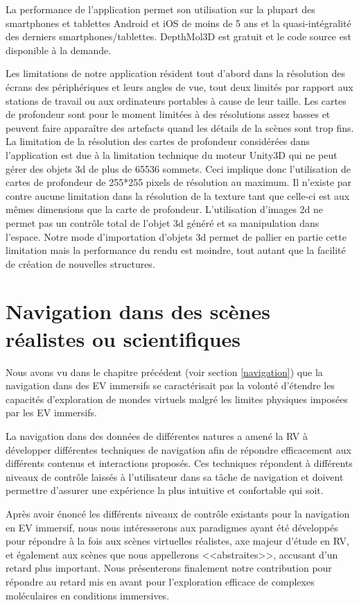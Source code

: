 La performance de l'application permet son utilisation sur la plupart des smartphones et tablettes Android et iOS de moins de 5 ans et la quasi-intégralité des derniers smartphones/tablettes. DepthMol3D est gratuit et le code source est disponible à la demande.

Les limitations de notre application résident tout d'abord dans la résolution des écrans des périphériques et leurs angles de vue, tout deux limités par rapport aux stations de travail ou aux ordinateurs portables à cause de leur taille. Les cartes de profondeur sont pour le moment limitées à des résolutions assez basses et peuvent faire apparaître des artefacts quand les détails de la scènes sont trop fins. La limitation de la résolution des cartes de profondeur considérées dans l'application est due à la limitation technique du moteur Unity3D qui ne peut gérer des objets 3d de plus de 65536 sommets. Ceci implique donc l'utilisation de cartes de profondeur de 255*255 pixels de résolution au maximum. Il n'existe par contre aucune limitation dans la résolution de la texture tant que celle-ci est aux mêmes dimensions que la carte de profondeur. L'utilisation d'images 2d ne permet pas un contrôle total de l'objet 3d généré et sa manipulation dans l'espace. Notre mode d'importation d'objets 3d permet de pallier en partie cette limitation mais la performance du rendu est moindre, tout autant que la facilité de création de nouvelles structures.


\section{Navigation dans des scènes réalistes ou scientifiques}

Nous avons vu dans le chapitre précédent (voir section \ref{navigation}) que la navigation dans des EV immersifs se caractérisait pas la volonté d'étendre les capacités d'exploration de mondes virtuels malgré les limites physiques imposées par les EV immersifs.

La navigation dans des données de différentes natures a amené la RV à développer différentes techniques de navigation afin de répondre efficacement aux différents contenus et interactions proposés. Ces techniques répondent à différents niveaux de contrôle laissés à l'utilisateur dans sa tâche de navigation et doivent permettre d'assurer une expérience la plus intuitive et confortable qui soit.

Après avoir énoncé les différents niveaux de contrôle existants pour la navigation en EV immersif, nous nous intéresserons aux paradigmes ayant été développés pour répondre à la fois aux scènes virtuelles réalistes, axe majeur d'étude en RV, et également aux scènes que nous appellerons <<abstraites>>, accusant d'un retard plus important.
Nous présenterons finalement notre contribution pour répondre au retard mis en avant pour l'exploration efficace de complexes moléculaires en conditions immersives.


